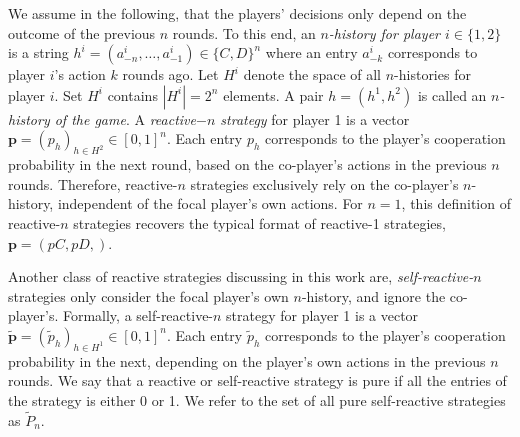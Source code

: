 \documentclass{article}
\theoremstyle{definition}
\begin{document}
We assume in the following, that the players' decisions only depend on the
outcome of the previous $n$ rounds. To this end, an {\it $n$-history for player
$i \in \{1, 2\}$} is a string $h^i=(a^i_{-n},\ldots,a^i_{-1})\!\in\!\{C,D\}^n$
where an entry $a^i_{-k}$ corresponds to player $i$'s action $k$ rounds ago. Let
$H^i$ denote the space of all $n$-histories for player $i$. Set $H^i$ contains
$|H^i|=2^{n}$ elements. A pair $h\!=\!(h^1,h^2)$ is called an {\it $n$-history
of the game}. A {\it reactive$-n$ strategy} for player 1 is a vector
$\mathbf{p}=(p_h)_{h\in H^2} \in [0, 1]^{n}$. Each entry $p_h$ corresponds to
the player's cooperation probability in the next round, based on the co-player's
actions in the previous $n$ rounds. Therefore, reactive-$n$ strategies
exclusively rely on the co-player's $n$-history, independent of the focal
player's own actions. For \(n=1\), this definition of reactive-\(n\) strategies
recovers the typical format of reactive-1 strategies, \(\mathbf{p}=(pC, pD,)\).

Another class of reactive strategies discussing in this work are, {\it
self-reactive-$n$} strategies only consider the focal player's own $n$-history,
and ignore the co-player's. Formally, a self-reactive-$n$ strategy for player 1
is a vector $\mathbf{\tilde{p}} = (\tilde{p}_h)_{h \in H^1} \in [0, 1] ^ {n}$.
Each entry $\tilde{p}_h$ corresponds to the player's cooperation probability in
the next, depending on the player's own actions in the previous $n$ rounds. We
say that a reactive or self-reactive strategy is pure if all the entries of the
strategy is either 0 or 1. We refer to the set of all pure self-reactive strategies
as $\tilde{P}_n$.
\end{document}
